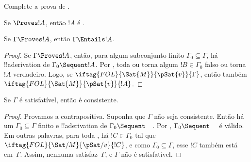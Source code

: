 \documentclass[../../../include/open-logic-section]{subfiles}
\begin{document}
\begin{prob}
Complete a prova de .
\end{prob}
\tagendprob

\begin{cor}
Se $\Proves !A$, então $!A$ é .
\end{cor}

\begin{cor}
Se $\Gamma \Proves !A$, então $\Gamma \Entails !A$.
\end{cor}

\begin{proof}
Se $\Gamma \Proves !A$, então, para algum subconjunto finito $\Gamma_0
\subseteq \Gamma$, há !!a{derivation} de $\Gamma_0 \Sequent !A$.  Por
, toda
ou torna algum $!B \in \Gamma_0$ falso ou torna $!A$ verdadeiro.  Logo,
se $\iftag{FOL}{\Sat{M}}{\pSat{v}}{\Gamma}$, então também
$\iftag{FOL}{\Sat{M}}{\pSat{v}}{!A}$.
\end{proof}

\begin{cor}
Se $\Gamma$ é satisfatível, então é consistente.
\end{cor}

\begin{proof}
Provamos a contrapositiva.  Suponha que $\Gamma$ não seja consistente.
Então há um $\Gamma_0 \subseteq \Gamma$ finito e !!a{derivation}
de $\Gamma_0 \Sequent \quad$.  Por ,
$\Gamma_0 \Sequent \quad$ é válido.  Em outras palavras, para toda
,
há $!C \in \Gamma_0$ tal que
$\iftag{FOL}{\Sat/{M}}{\pSat/{v}}{!C}$, e como $\Gamma_0
\subseteq \Gamma$, esse $!C$ também está em~$\Gamma$.  Assim, nenhuma
 satisfaz~$\Gamma$, e
$\Gamma$ não é satisfatível.
\end{proof}
\end{document}
